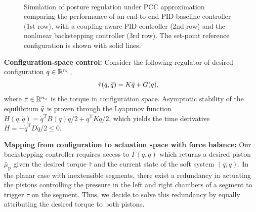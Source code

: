 \begin{figure}[ht]
  \\
  \caption{Simulation of posture regulation under \gls{PCC} approximation comparing the performance of an end-to-end PID baseline controller (1st row), with a coupling-aware PID controller (2nd row) and the nonlinear backstepping controller (3rd row). The set-point reference configuration is shown with solid lines.}
  \vspace{-0.5cm}
  \label{fig:time_series_plots}
\end{figure}

\textbf{Configuration-space control:}
%
Consider the following regulator of desired configuration $\Bar{q} \in \mathbb{R}^{n_\mathrm{q}}$, 
%
\begin{equation}\small\label{eq:high_level_regulation}
    \Bar{\tau}(q, \Bar{q}) = K \Bar{q} + G(q),
\end{equation}
%
where $\Bar{\tau} \in \mathbb{R}^{n_\mathrm{q}}$ is the torque in configuration space. %
%
Asymptotic stability of the equilibrium $\Bar{q}$ is proven through the Lyapunov function $H(q, \dot{q}) = \dot{q}^{\mathrm{T}} B(q) \dot{q}/2 + q^\mathrm{T} K q/2$, which yields the time derivative $\dot{H} = -\dot{q}^\mathrm{T} D \dot{q}/2 \leq 0$.

\textbf{Mapping from configuration to actuation space with force balance:}
Our backstepping controller requires access to $\Gamma(q,\dot{q})$ which returns a desired piston $\bar{\mu}_\mathrm{p}$ given the desired torque $\bar{\tau}$ and the current state of the soft system $(q,\dot{q})$. In the planar case with inextensible segments, there exist a redundancy in actuating the pistons controlling the pressure in the left and right chambers of a segment to trigger $\bar{\tau}$ on the segment. Thus, we decide to solve this redundancy by equally attributing the desired torque to both pistons.

